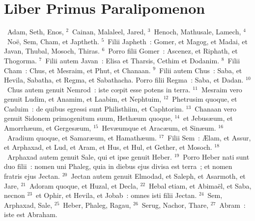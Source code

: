 {\centering \section*{Liber Primus Paralipomenon}}\thispagestyle{empty}

~Adam, Seth, Enos,
${}^{2}$~Cainan, Malaleel, Jared,
${}^{3}$~Henoch, Mathusale, Lamech,
${}^{4}$~No\"e, Sem, Cham, et Japtheth.
${}^{5}$~Filii Japheth~: Gomer, et Magog, et Madai, et Javan, Thubal, Mosoch, Thiras.
${}^{6}$~Porro filii Gomer~: Ascenez, et Riphath, et Thogorma.
${}^{7}$~Filii autem Javan~: Elisa et Tharsis, Cethim et Dodanim.
${}^{8}$~Filii Cham~: Chus, et Mesraim, et Phut, et Chanaan.
${}^{9}$~Filii autem Chus~: Saba, et Hevila, Sabatha, et Regma, et Sabathacha. Porro filii Regma~: Saba, et Dadan.
${}^{10}$~Chus autem genuit Nemrod~: iste cœpit esse potens in terra.
${}^{11}$~Mesraim vero genuit Ludim, et Anamim, et Laabim, et Nephtuim,
${}^{12}$~Phetrusim quoque, et Casluim~: de quibus egressi sunt Philisthiim, et Caphtorim.
${}^{13}$~Chanaan vero genuit Sidonem primogenitum suum, Heth\ae um quoque,
${}^{14}$~et Jebus\ae um, et Amorrh\ae um, et Gerges\ae um,
${}^{15}$~Hev\ae umque et Arac\ae um, et Sin\ae um.
${}^{16}$~Aradium quoque, et Samar\ae um, et Hamath\ae um.
${}^{17}$~Filii Sem~: \AE lam, et Assur, et Arphaxad, et Lud, et Aram, et Hus, et Hul, et Gether, et Mosoch.
${}^{18}$~Arphaxad autem genuit Sale, qui et ipse genuit Heber.
${}^{19}$~Porro Heber nati sunt duo filii~: nomen uni Phaleg, quia in diebus ejus divisa est terra~; et nomen fratris ejus Jectan.
${}^{20}$~Jectan autem genuit Elmodad, et Saleph, et Asarmoth, et Jare,
${}^{21}$~Adoram quoque, et Huzal, et Decla,
${}^{22}$~Hebal etiam, et Abima\"el, et Saba, necnon
${}^{23}$~et Ophir, et Hevila, et Jobab~: omnes isti filii Jectan.
${}^{24}$~Sem, Arphaxad, Sale,
${}^{25}$~Heber, Phaleg, Ragau,
${}^{26}$~Serug, Nachor, Thare,
${}^{27}$~Abram~: iste est Abraham.


